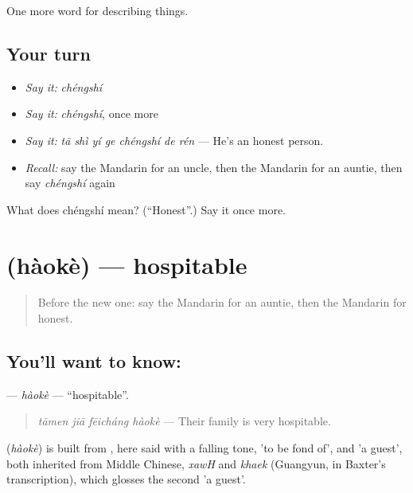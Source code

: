 \begin{grammarlens}[title={What you've built}]
One more word for describing things.
\end{grammarlens}

\subsection*{Your turn}
\begin{itemize}
\raggedright
  \item \emph{Say it:} \emph{chéngshí}
  \item \emph{Say it:} \emph{chéngshí}, once more
  \item \emph{Say it:} \emph{tā shì yí ge chéngshí de rén} — He's an honest person.
  \item \emph{Recall:} say the Mandarin for an uncle, then the Mandarin for an auntie, then say \emph{chéngshí} again
\end{itemize}

\begin{tcolorbox}[breakable,colback=teal!4,colframe=teal!35!black,title={Before you move on}]
What does chéngshí mean? (\textquotedblleft{}Honest\textquotedblright{}.) Say it once more.
\end{tcolorbox}
\section[\texorpdfstring{\zh{好客} (hàokè)}{好客 (hàokè)}]{ (hàokè) — hospitable}

\label{lesson:ZH-C273-haoke}



\begin{quote}
Before the new one: say the Mandarin for an auntie, then the Mandarin for honest.
\end{quote}

\subsection*{You'll want to know: }
\textbf{} — \emph{hàokè} — \textquotedblleft{}hospitable\textquotedblright{}.

\begin{quote}
\emph{tāmen jiā fēicháng hàokè} — Their family is very hospitable.
\end{quote}

\begin{cousinweb}
\textbf{} (\emph{hàokè}) is built from , here said with a falling tone, 'to be fond of', and  'a guest', both inherited from Middle Chinese, \emph{xawH} and \emph{khaek} (Guangyun, in Baxter's transcription), which glosses the second 'a guest'.
\end{cousinweb}

